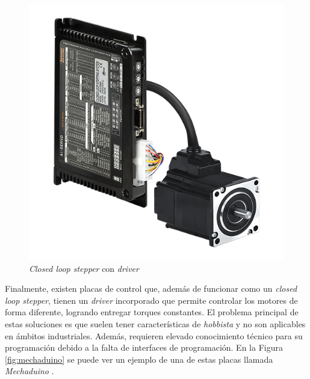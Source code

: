 \begin{figure}[htbp]
	\centering
	\includegraphics[scale=.6]{./Figures/closed_loop_stepper.png}
	\caption{\textit{Closed loop stepper} con \textit{driver}\protect\footnotemark}
	\label{fig:closed-loop-stepper}
\end{figure}


Finalmente, existen placas de control que, además de funcionar como un \textit{closed loop stepper}, tienen un \textit{driver} incorporado que permite controlar los motores de forma diferente, logrando entregar torques constantes. El problema principal de estas soluciones es que suelen tener características de \textit{hobbista} y no son aplicables en ámbitos industriales. Además, requieren elevado conocimiento técnico para su programación debido a la falta de interfaces de programación. En la Figura \ref{fig:mechaduino} se puede ver un ejemplo de una de estas placas llamada \textit{Mechaduino} \citep{web_mechaduino}.

